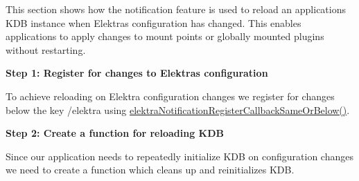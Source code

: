 This section shows how the notification feature is used to reload an application\textquotesingle{}s K\+DB instance when Elektra\textquotesingle{}s configuration has changed. This enables applications to apply changes to mount points or globally mounted plugins without restarting.

{\bfseries{Step 1\+: Register for changes to Elektra\textquotesingle{}s configuration}}

To achieve reloading on Elektra configuration changes we register for changes below the key {\ttfamily /elektra} using {\ttfamily \mbox{\hyperlink{group__kdbnotification_ga374edd4f4fff527d6511ce4d0df62681}{elektra\+Notification\+Register\+Callback\+Same\+Or\+Below()}}}.


\begin{DoxyCode}{0}
\end{DoxyCode}


{\bfseries{Step 2\+: Create a function for reloading K\+DB}}

Since our application needs to repeatedly initialize K\+DB on configuration changes we need to create a function which cleans up and reinitializes K\+DB.


